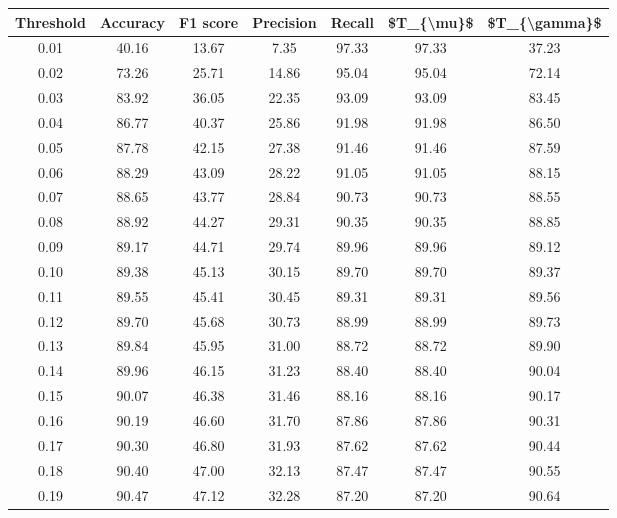 \begin{tabular}{|c|c|c|c|c|c|c|}
\hline
 Threshold &  Accuracy &  F1 score &  Precision &  Recall &  \$T\_\{\textbackslash mu\}\$ &  \$T\_\{\textbackslash gamma\}\$ \\
\hline
      0.01 &     40.16 &     13.67 &       7.35 &   97.33 &      97.33 &         37.23 \\
      0.02 &     73.26 &     25.71 &      14.86 &   95.04 &      95.04 &         72.14 \\
      0.03 &     83.92 &     36.05 &      22.35 &   93.09 &      93.09 &         83.45 \\
      0.04 &     86.77 &     40.37 &      25.86 &   91.98 &      91.98 &         86.50 \\
      0.05 &     87.78 &     42.15 &      27.38 &   91.46 &      91.46 &         87.59 \\
      0.06 &     88.29 &     43.09 &      28.22 &   91.05 &      91.05 &         88.15 \\
      0.07 &     88.65 &     43.77 &      28.84 &   90.73 &      90.73 &         88.55 \\
      0.08 &     88.92 &     44.27 &      29.31 &   90.35 &      90.35 &         88.85 \\
      0.09 &     89.17 &     44.71 &      29.74 &   89.96 &      89.96 &         89.12 \\
      0.10 &     89.38 &     45.13 &      30.15 &   89.70 &      89.70 &         89.37 \\
      0.11 &     89.55 &     45.41 &      30.45 &   89.31 &      89.31 &         89.56 \\
      0.12 &     89.70 &     45.68 &      30.73 &   88.99 &      88.99 &         89.73 \\
      0.13 &     89.84 &     45.95 &      31.00 &   88.72 &      88.72 &         89.90 \\
      0.14 &     89.96 &     46.15 &      31.23 &   88.40 &      88.40 &         90.04 \\
      0.15 &     90.07 &     46.38 &      31.46 &   88.16 &      88.16 &         90.17 \\
      0.16 &     90.19 &     46.60 &      31.70 &   87.86 &      87.86 &         90.31 \\
      0.17 &     90.30 &     46.80 &      31.93 &   87.62 &      87.62 &         90.44 \\
      0.18 &     90.40 &     47.00 &      32.13 &   87.47 &      87.47 &         90.55 \\
      0.19 &     90.47 &     47.12 &      32.28 &   87.20 &      87.20 &         90.64 \\

\end{tabular}
